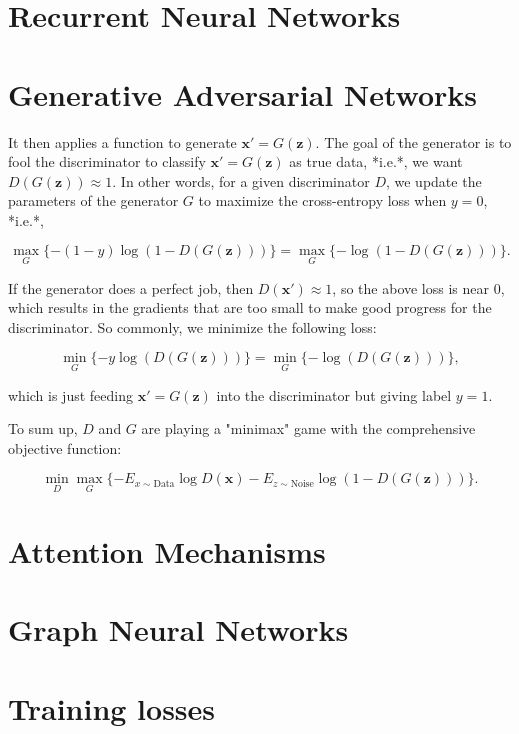 \section{Recurrent Neural Networks}
\label{sec:3_rnns}

\section{Generative Adversarial Networks}
\label{sec:3_gans}

It then applies a function to generate $\mathbf x'=G(\mathbf z)$. The goal of the generator is to fool the discriminator to classify $\mathbf x'=G(\mathbf z)$ as true data, *i.e.*, we want $D( G(\mathbf z)) \approx 1$.
In other words, for a given discriminator $D$, we update the parameters of the generator $G$ to maximize the cross-entropy loss when $y=0$, *i.e.*,

$$ \max_G \{ - (1-y) \log(1-D(G(\mathbf z))) \} = \max_G \{ - \log(1-D(G(\mathbf z))) \}.$$

If the generator does a perfect job, then $D(\mathbf x')\approx 1$, so the above loss is near 0, which results in the gradients that are too small to make good progress for the discriminator. So commonly, we minimize the following loss:

$$ \min_G \{ - y \log(D(G(\mathbf z))) \} = \min_G \{ - \log(D(G(\mathbf z))) \}, $$

which is just feeding $\mathbf x'=G(\mathbf z)$ into the discriminator but giving label $y=1$.


To sum up, $D$ and $G$ are playing a "minimax" game with the comprehensive objective function:

$$\min_D \max_G \{ -E_{x \sim \text{Data}} \log D(\mathbf x) - E_{z \sim \text{Noise}} \log(1 - D(G(\mathbf z))) \}.$$

\section{Attention Mechanisms}
\label{sec:3_attention}

\section{Graph Neural Networks}
\label{sec:3_gnns}

\section{Training losses}
\label{sec:3_losses}
